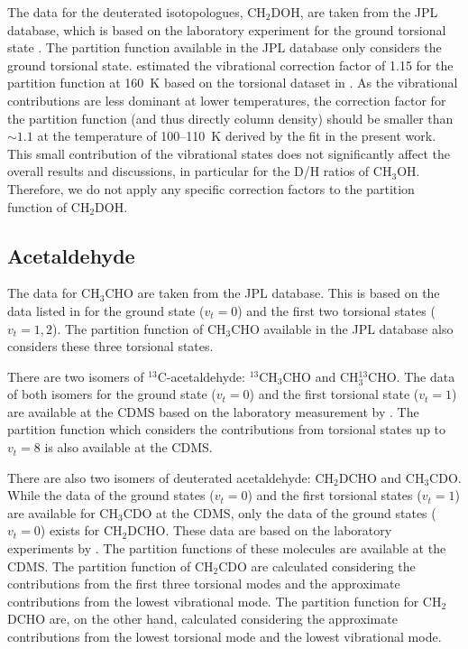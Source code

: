 \documentclass[twocolumn, twocolappendix, astrosymb, times]{aastex631}
\newcommand{\methanol}{CH$_3$OH\xspace}
\newcommand{\acetaldehyde}{CH$_3$CHO\xspace}
\begin{document}
The data for the deuterated isotopologues, CH$_2$DOH, are taken from the JPL database, which is based on the laboratory experiment for the ground torsional state \citep{Pearson2012}. The partition function available in the JPL database only considers the ground torsional state. \citet{Taquet2019} estimated the vibrational correction factor of 1.15 for the partition function at 160~K based on the torsional dataset in \citet{Lauvergnat2009}. As the vibrational contributions are less dominant at lower temperatures, the correction factor for the partition function (and thus directly column density) should be smaller than $\sim1.1$ at the temperature of 100--110~K derived by the fit in the present work. This small contribution of the vibrational states does not significantly affect the overall results and discussions, in particular for the D/H ratios of \methanol. Therefore, we do not apply any specific correction factors to the partition function of CH$_2$DOH.  

\subsection{Acetaldehyde}
The data for \acetaldehyde are taken from the JPL database. This is based on the data listed in \citep{Kleiner1996} for the ground state ($v_t = 0$) and the first two torsional states ($v_t = 1, 2$). The partition function of \acetaldehyde available in the JPL database also considers these three torsional states. 

There are two isomers of $^{13}$C-acetaldehyde: $^{13}$CH$_3$CHO and CH$_3^{13}$CHO. The data of both isomers for the ground state ($v_t = 0$) and the first torsional state ($v_t = 1$) are available at the CDMS based on the laboratory measurement by \citep{Margules2015}. The partition function which considers the contributions from torsional states up to $v_t = 8$ is also available at the CDMS.

There are also two isomers of deuterated acetaldehyde: CH$_2$DCHO and CH$_3$CDO. While the data of the ground states ($v_t = 0$) and the first torsional states ($v_t = 1$) are available for CH$_3$CDO at the CDMS, only the data of the ground states ($v_t = 0$) exists for CH$_2$DCHO. These data are based on the laboratory experiments by \citet{Coudert2019}. The partition functions of these molecules are available at the CDMS. The partition function of CH$_2$CDO are calculated considering the contributions from the first three torsional modes and the approximate contributions from the lowest vibrational mode. The partition function for CH$_2$DCHO are, on the other hand, calculated considering the approximate contributions from the lowest torsional mode and the lowest vibrational mode.
\end{document}
